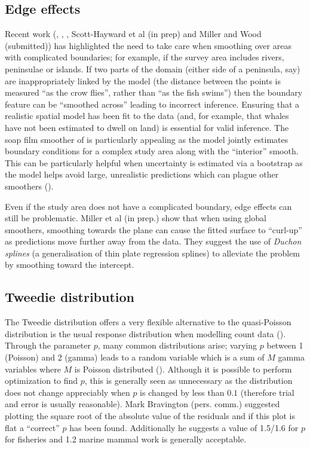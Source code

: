 \documentclass[a4paper,12pt]{article}
\begin{document}
\subsection*{Edge effects}
\label{s:leakage}

Recent work (\cite{Ramsay:2002uo}, \cite{Wang:2007tf}, \cite{Wood:2008vo}, Scott-Hayward et al (in prep) and Miller and Wood (submitted)) has highlighted the need to take care when smoothing over areas with complicated boundaries; for example, if the survey area includes rivers, peninsulae or islands. If two parts of the domain (either side of a peninsula, say) are inappropriately linked by the model (the distance between the points is measured ``as the crow flies'', rather than ``as the fish swims'') then the boundary feature can be ``smoothed across'' leading to incorrect inference. Ensuring that a realistic spatial model has been fit to the data (and, for example, that whales have not been estimated to dwell on land) is essential for valid inference. The soap film smoother of \cite{Wood:2008vo} is particularly appealing as the model jointly estimates boundary conditions for a complex study area along with the ``interior'' smooth. This can be particularly helpful when uncertainty is estimated via a bootstrap as the model helps avoid large, unrealistic predictions which can plague other smoothers (\cite{Bravington:2009vo}).

Even if the study area does not have a complicated boundary, edge effects can still be problematic. Miller et al (in prep.) show that when using global smoothers, smoothing towards the plane can cause the fitted surface to ``curl-up'' as predictions move further away from the data. They suggest the use of \textit{Duchon splines} (a generalisation of thin plate regression splines) to alleviate the problem by smoothing toward the intercept.

\subsection*{Tweedie distribution}
\label{s:Tweedie}

The Tweedie distribution offers a very flexible alternative to the quasi-Poisson distribution is the usual response distribution when modelling count data (\cite{Candy:2004tb}). Through the parameter $p$, many common distributions arise; varying $p$ between 1 (Poisson) and 2 (gamma) leads to a random variable which is a sum of $M$ gamma variables where $M$ is Poisson distributed (\cite{Jorgensen:1987vg}). Although it is possible to perform optimization to find $p$, this is generally seen as unnecessary as the distribution does not change appreciably when $p$ is changed by less than $0.1$ (therefore trial and error is usually reasonable). Mark Bravington (pers. comm.) suggested plotting the square root of the absolute value of the residuals and if this plot is flat a ``correct'' $p$ has been found. Additionally he suggests a value of 1.5/1.6 for $p$ for fisheries and 1.2 marine mammal work is generally acceptable.
\end{document}
